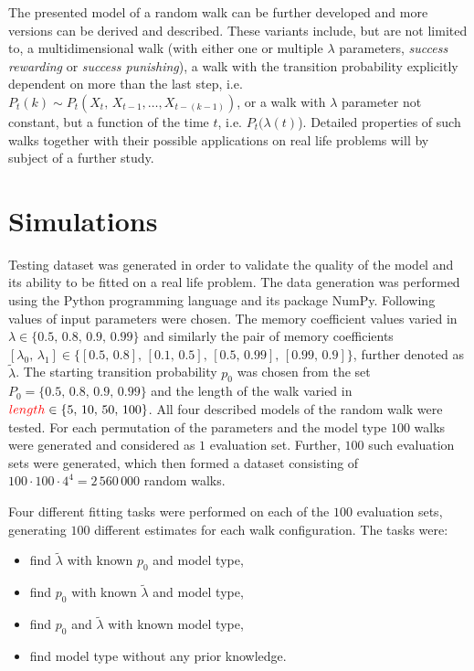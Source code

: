 \documentclass{amsart}
\theoremstyle{definition}
\theoremstyle{plain}
\theoremstyle{plain}
\theoremstyle{plain}
\numberwithin{equation}{section}
\begin{document}
    The presented model of a random walk can be further developed and
    more versions can be derived and described. These variants include,
    but are not limited to, a multidimensional walk (with either one or multiple
    $\lambda$ parameters, \emph{success rewarding} or \emph{success
    punishing}), a walk with the transition probability explicitly dependent
    on more than the last step, i.e. $P_{t}(k)\sim P_{t}(X_{t},\,X_{t-1},\dots,X_{t-(k-1)})$,
    or a walk with $\lambda$ parameter not constant, but a function
    of the time $t$, i.e. $P_{t}(\lambda(t)$). Detailed properties of
    such walks together with their possible applications on real life
    problems will by subject of a further study.


    \section{Simulations\label{sec:Simulations}}

    Testing dataset was generated in order to validate the quality of
    the model and its ability to be fitted on a real life problem. The
    data generation was performed using the Python programming language
    and its package NumPy. Following values of input parameters were chosen.
    The memory coefficient values varied in $\lambda\in\{0.5,\,0.8,\,0.9,\,0.99\}$
    and similarly the pair of memory coefficients $[\lambda_{0},\,\lambda_{1}]\in\{[0.5,\,0.8],\,[0.1,\,0.5],\,[0.5,\,0.99],\,[0.99,\,0.9]\}$, further denoted as $\tilde{\lambda}$.
    The starting transition probability $p_{0}$ was chosen from the set
    $P_{0}=\{0.5,\,0.8,\,0.9,\,0.99\}$ and the length of the walk varied in
    \textbf{${\color{red}length}\in\{5,\,10,\,50,\,100\}$}. All four described models of the random walk were tested. For each permutation of the
    parameters and the model type $100$ walks were generated and considered as $1$ {\color{red}evaluation set}. Further, $100$ such {\color{red}evaluation sets} were generated, which then formed a dataset consisting of $100\cdot100\cdot4^4=2\,560\,000$ random walks.

    Four different fitting tasks were performed on each of the $100$ {\color{red}evaluation sets}, generating $100$ different estimates for each walk configuration. The tasks were:

    \begin{itemize}
        \item find $\tilde{\lambda}$ with known $p_{0}$ and model type,
        \item find $p_{0}$ with known $\tilde{\lambda}$ and model type,
        \item find $p_{0}$ and $\tilde{\lambda}$ with known model type,
        \item find model type without any prior knowledge.
    \end{itemize}
\end{document}
